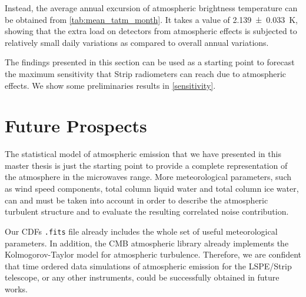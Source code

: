 Instead, the average annual excursion of atmospheric brightness temperature
can be obtained from \autoref{tab:mean_tatm_month}. It takes a value of
\SI{2.139 \pm 0.033}{\kelvin}, showing that the extra load on detectors
from atmospheric effects is subjected to relatively small daily variations
as compared to overall annual variations.

The findings presented in this section can be used as a starting point to
forecast the maximum sensitivity that Strip radiometers can reach due to
atmospheric effects.  We show some preliminaries results in
\autoref{sensitivity}.

\section{Future Prospects}

The statistical model of atmospheric emission that we have presented in
this master thesis is just the starting point to provide a complete
representation of the atmosphere in the microwaves range. More
meteorological parameters, such as wind speed components, total column
liquid water and total column ice water, can and must be taken into account
in order to describe the atmospheric turbulent structure and to evaluate
the resulting correlated noise contribution.

Our CDFs \texttt{.fits} file already includes the whole set of useful
meteorological parameters. In addition, the CMB atmospheric library already
implements the Kolmogorov-Taylor model for atmospheric turbulence.
Therefore, we are confident that time ordered data simulations of
atmospheric emission for the LSPE/Strip telescope, or any other
instruments, could be successfully obtained in future works.
